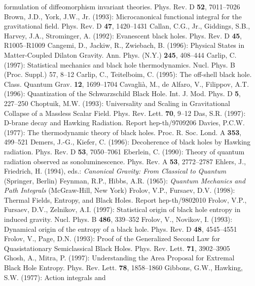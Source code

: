 \documentclass[12pt]{article}
\begin{document}
\begin{thebibliography}{999}
formulation of diffeomorphism invariant theories.
Phys. Rev. D {\bf 52}, 7011--7026
%
\bibitem{}{}{}
Brown, J.D., York, J.W., Jr. (1993): Microcanonical functional integral
for the gravitational field. Phys. Rev. D {\bf 47}, 1420--1431
%
\bibitem{}{}{}
Callan, C.G., Jr., Giddings, S.B., Harvey, J.A., Strominger, A.
(1992): Evanescent black holes. Phys. Rev. D {\bf 45}, R1005--R1009
%
\bibitem{}{}{}
Cangemi, D., Jackiw, R., Zwiebach, B. (1996): Physical States
in Matter-Coupled Dilaton Gravity. Ann. Phys. (N.Y.) {\bf 245},
408--444
%
\bibitem{}{}{}
Carlip, C. (1997): Statistical mechanics and black hole
thermodynamics. Nucl. Phys. B (Proc. Suppl.) 57, 8--12
%
\bibitem{}{}{}
Carlip, C., Teitelboim, C. (1995): The off-shell black hole.
Class. Quantum Grav. {\bf 12}, 1699--1704
% 
\bibitem{}{}{}
Cavagli\`{a}, M., de Alfaro, V., Filippov, A.T. (1996):
Quantization of the Schwarzschild Black Hole.
Int. J. Mod. Phys. D {\bf 5}, 227--250
%
\bibitem{}{}{}
Choptuik, M.W. (1993): Universality and Scaling in Gravitational
Collapse of a Massless Scalar Field.
Phys. Rev. Lett. {\bf 70}, 9--12
%
\bibitem{}{}{}
Das, S.R. (1997): D-brane decay and Hawking Radiation.
Report hep-th/9709206
%
\bibitem{}{}{}
Davies, P.C.W. (1977): The thermodynamic theory of black holes.
Proc. R. Soc. Lond. A {\bf 353}, 499--521
%
\bibitem{}{}{}
Demers, J.-G., Kiefer, C. (1996): Decoherence of black holes
by Hawking radiation. Phys. Rev. D {\bf 53}, 7050--7061
%
\bibitem{}{}{}
Eberlein, C. (1990):
Theory of quantum radiation observed as sonoluminescence.
Phys. Rev. A {\bf 53}, 2772--2787
%
\bibitem{}{}{}
Ehlers, J., Friedrich, H. (1994), eds.: {\it Canonical Gravity:
From Classical to Quantum} (Springer, Berlin)
%
\bibitem{}{}{}
Feynman, R.P., Hibbs, A.R. (1965): {\it Quantum Mechanics and
Path Integrals} (McGraw-Hill, New York)
%
\bibitem{}{}{}
Frolov, V.P., Fursaev, D.V. (1998): Thermal Fields, Entropy,
and Black Holes. Report hep-th/9802010
%
\bibitem{}{}{}
Frolov, V.P., Fursaev, D.V., Zelnikov, A.I. (1997):
Statistical origin of black hole entropy in induced gravity.
Nucl. Phys. B {\bf 486}, 339--352
%
\bibitem{}{}{}
Frolov, V., Novikov, I. (1993): Dynamical origin of the entropy
of a black hole. Phys. Rev. D {\bf 48}, 4545--4551
%
\bibitem{}{}{}
Frolov, V., Page, D.N. (1993): Proof of the Generalized Second Law
for Quasistationary Semiclassical Black Holes.
Phys. Rev. Lett. {\bf 71}, 3902--3905
%
\bibitem{}{}{}
Ghosh, A., Mitra, P. (1997): Understanding the Area Proposal for
Extremal Black Hole Entropy. Phys. Rev. Lett. {\bf 78}, 1858--1860
%
\bibitem{}{}{}
Gibbons, G.W., Hawking, S.W. (1977): Action integrals and

\end{thebibliography}
\end{document}
